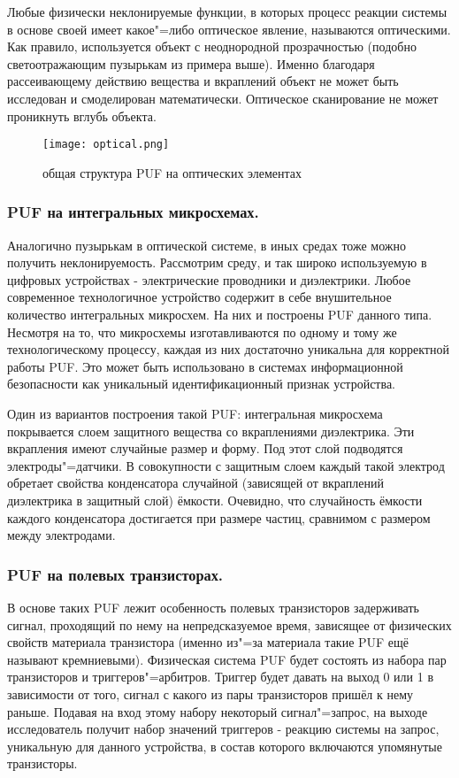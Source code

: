 \begin{enumerate}
Любые физически неклонируемые функции, в которых процесс реакции системы в основе своей имеет какое"=либо оптическое явление, называются оптическими.
Как правило, используется объект с неоднородной прозрачностью (подобно светоотражающим пузырькам из примера выше). Именно благодаря рассеивающему действию вещества и вкраплений объект не может быть исследован и смоделирован математически. Оптическое сканирование не может проникнуть вглубь объекта.
\begin{figure}[ht]
    \centering
    \label{fig:domain:puf_physical_types:optical}
    \texttt{[image: optical.png]}
    \caption{общая структура PUF на оптических элементах}
\end{figure}


\subsubsection{PUF на интегральных микросхемах. }
\label{sub:domain:puf_physical_types:ic}

Аналогично пузырькам в оптической системе, в иных средах тоже можно получить неклонируемость. Рассмотрим среду, и так широко используемую в цифровых устройствах - электрические проводники и диэлектрики.
Любое современное технологичное устройство содержит в себе внушительное количество интегральных микросхем. На них и построены PUF данного типа. Несмотря на то, что микросхемы изготавливаются по одному и тому же технологическому процессу, каждая из них достаточно уникальна для корректной работы PUF. Это может быть использовано в системах информационной безопасности как уникальный идентификационный признак устройства.

Один из вариантов построения такой PUF: интегральная микросхема покрывается слоем защитного вещества со вкраплениями диэлектрика. Эти вкрапления имеют случайные размер и форму. Под этот слой подводятся электроды"=датчики. В совокупности с защитным слоем каждый такой электрод обретает свойства конденсатора случайной (зависящей от вкраплений диэлектрика в защитный слой) ёмкости. Очевидно, что случайность ёмкости каждого конденсатора достигается при размере частиц, сравнимом с размером между электродами.


\subsubsection{PUF на полевых транзисторах. }
\label{sub:domain:puf_physical_types:transistors}

В основе таких PUF лежит особенность полевых транзисторов задерживать сигнал, проходящий по нему на непредсказуемое время, зависящее от физических свойств материала транзистора (именно из"=за материала такие PUF ещё называют кремниевыми). Физическая система PUF будет состоять из набора пар транзисторов и триггеров"=арбитров. Триггер будет давать на выход 0 или 1 в зависимости от того, сигнал с какого из пары транзисторов пришёл к нему раньше. Подавая на вход этому набору некоторый сигнал"=запрос, на выходе исследователь получит набор значений триггеров - реакцию системы на запрос, уникальную для данного устройства, в состав которого включаются упомянутые транзисторы.


\end{enumerate}
